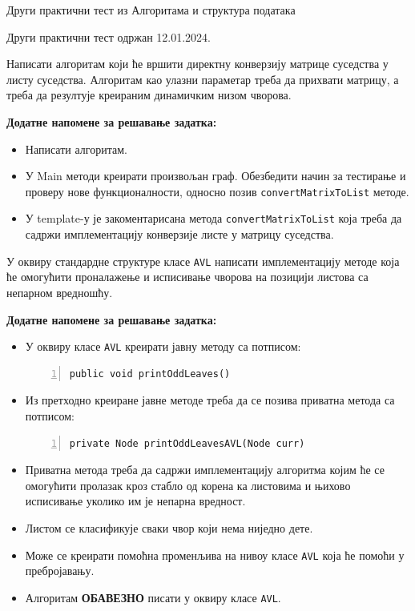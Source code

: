 
Други практични тест из Алгоритама и структура података

Други практични тест одржан 12.01.2024.

Написати алгоритам који ће вршити директну конверзију матрице суседства у листу суседства. Алгоритам као улазни параметар треба да прихвати матрицу, а треба да резултује креираним динамичким низом чворова.

\textbf{Додатне напомене за решавање задатка:}
\begin{itemize}
	\item Написати алгоритам.
	\item У Main методи креирати произвољан граф. Обезбедити начин за тестирање и проверу нове функционалности, односно позив \texttt{convertMatrixToList} методе.
	\item У template-у је закоментарисана метода \texttt{convertMatrixToList} која треба да садржи имплементацију конверзије листе у матрицу суседства.
\end{itemize}



У оквиру стандардне структуре класе \texttt{AVL} написати имплементацију методе која ће омогућити проналажење и исписивање чворова на позицији листова са непарном вредношћу.

\textbf{Додатне напомене за решавање задатка:}
\begin{itemize}
	\item У оквиру класе \texttt{AVL} креирати јавну методу са потписом:
	\begin{Verbatim}[fontsize=\footnotesize, numbers=left, xleftmargin=10mm]
public void printOddLeaves()
	\end{Verbatim}
	\item Из претходно креиране јавне методе треба да се позива приватна метода са потписом:
	\begin{Verbatim}[fontsize=\footnotesize, numbers=left, xleftmargin=10mm]
private Node printOddLeavesAVL(Node curr)
	\end{Verbatim}
	\item Приватна метода треба да садржи имплементацију алгоритма којим ће се омогућити пролазак кроз стабло од корена ка листовима и њихово исписивање уколико им је непарна вредност.
	\item Листом се класификује сваки чвор који нема ниједно дете.
	\item Може се креирати помоћна променљива на нивоу класе \texttt{AVL} која ће помоћи у пребројавању.
	\item Алгоритам \textbf{ОБАВЕЗНО} писати у оквиру класе \texttt{AVL}.
\end{itemize}

